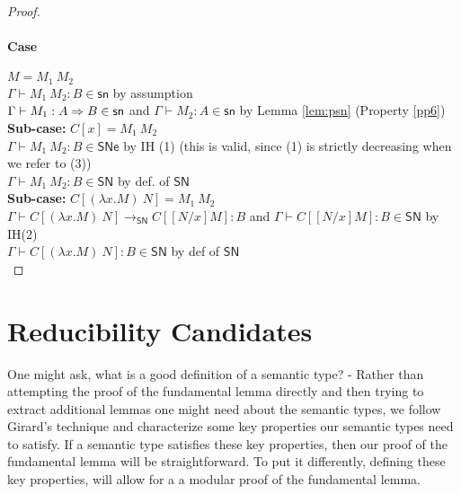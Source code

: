 \documentclass{article}
\newcommand{\SN}{\mathsf{SN}}
\newcommand{\SNe}{\mathsf{SNe}}
\newcommand{\csn}{\mathsf{sn}}
\newcommand{\redSN}{\longrightarrow_\SN}
\begin{document}
\begin{proof}
\paragraph{Case} $M = M_1~M_2$
\\[1em]
$\Gamma \vdash M_1~M_2 : B \in \csn$ \hfill by assumption\\
$\Gamma \vdash M_1 : A \arrow B \in \csn$ and $\Gamma \vdash M_2 : A \in \csn$ \hfill by Lemma \ref{lem:psn} (Property \ref{pp6})
\\[0.5em]
 \textbf{Sub-case:} $C[x] = M_1~M_2$ \\[0.5em]
 $\Gamma \vdash M_1~M_2 : B \in \SNe$ \hfill by IH (1) (this is valid,
 since (1) is strictly decreasing when we refer to (3))\\
 $\Gamma \vdash M_1~M_2 : B \in \SN$ \hfill by def. of $\SN$
 \\[1em]
 \textbf{Sub-case:} $C[(\lambda x.M)~N] = M_1~M_2$ \\[0.5em]
 $\Gamma \vdash C[(\lambda x.M)~N] \redSN C[[N/x]M] : B$ and $\Gamma \vdash C[[N/x]M] : B\in \SN$ \hfill by IH(2)\\
 $\Gamma \vdash C[(\lambda x.M)~N] : B \in \SN$ \hfill by def of $\SN$ \\

\end{proof}


\section{Reducibility Candidates}
One might ask, what is a good definition of a semantic type? - Rather than
attempting the proof of the fundamental lemma directly and then trying to
extract additional lemmas one might need about the semantic types, we follow
Girard's technique and characterize some key properties our semantic types need
to satisfy. If a semantic type satisfies these key properties, then our proof of the fundamental lemma will be straightforward. To put it differently, defining these key properties, will allow for a  a modular proof of the fundamental lemma.
\end{document}
